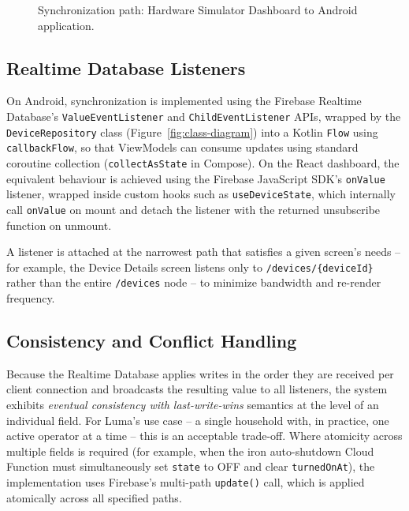 \documentclass[11pt,a4paper]{article}
\begin{document}
\begin{figure}[H]
\centering
{}
\caption{Synchronization path: Hardware Simulator Dashboard to Android application.}
\label{fig:sync-dash-to-android}
\end{figure}

\subsection{Realtime Database Listeners}
On Android, synchronization is implemented using the Firebase Realtime Database's \texttt{ValueEventListener} and \texttt{ChildEventListener} APIs, wrapped by the \texttt{DeviceRepository} class (Figure~\ref{fig:class-diagram}) into a Kotlin \texttt{Flow} using \texttt{callbackFlow}, so that ViewModels can consume updates using standard coroutine collection (\texttt{collectAsState} in Compose). On the React dashboard, the equivalent behaviour is achieved using the Firebase JavaScript SDK's \texttt{onValue} listener, wrapped inside custom hooks such as \texttt{useDeviceState}, which internally call \texttt{onValue} on mount and detach the listener with the returned unsubscribe function on unmount.

A listener is attached at the narrowest path that satisfies a given screen's needs -- for example, the Device Details screen listens only to \texttt{/devices/\{deviceId\}} rather than the entire \texttt{/devices} node -- to minimize bandwidth and re-render frequency.

\subsection{Consistency and Conflict Handling}
Because the Realtime Database applies writes in the order they are received per client connection and broadcasts the resulting value to all listeners, the system exhibits \emph{eventual consistency with last-write-wins} semantics at the level of an individual field. For Luma's use case -- a single household with, in practice, one active operator at a time -- this is an acceptable trade-off. Where atomicity across multiple fields is required (for example, when the iron auto-shutdown Cloud Function must simultaneously set \texttt{state} to OFF and clear \texttt{turnedOnAt}), the implementation uses Firebase's multi-path \texttt{update()} call, which is applied atomically across all specified paths.
\end{document}
